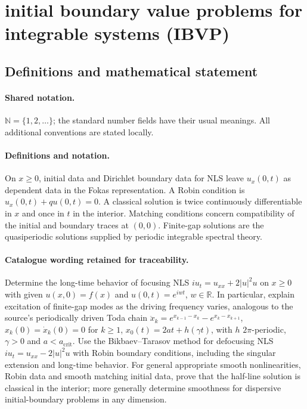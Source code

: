 \documentclass[11pt]{article}
\begin{document}
\section{initial boundary value problems for integrable systems (IBVP)}\label{statement}

\subsection{Definitions and mathematical statement}

\paragraph{Shared notation.}$\mathbb N=\{1,2,\ldots\}$; the standard number fields have their usual meanings. All additional conventions are stated locally.


\paragraph{Definitions and notation.}On $x\ge0$, initial data and Dirichlet boundary data for NLS leave $u_x(0,t)$ as dependent data in the Fokas representation. A Robin condition is $u_x(0,t)+qu(0,t)=0$. A classical solution is twice continuously differentiable in $x$ and once in $t$ in the interior. Matching conditions concern compatibility of the initial and boundary traces at $(0,0)$. Finite-gap solutions are the quasiperiodic solutions supplied by periodic integrable spectral theory.

\paragraph{Catalogue wording retained for traceability.}
Determine the long-time behavior of focusing NLS $iu_t=u_{xx}+2|u|^2u$ on $x\ge0$ with given $u(x,0)=f(x)$ and $u(0,t)=e^{iwt}$, $w\in\mathbb R$. In particular, explain excitation of finite-gap modes as the driving frequency varies, analogous to the source’s periodically driven Toda chain $\ddot x_k=e^{x_{k-1}-x_k}-e^{x_k-x_{k+1}}$, $x_k(0)=\dot x_k(0)=0$ for $k\ge1$, $x_0(t)=2at+h(\gamma t)$, with $h$ $2\pi$-periodic, $\gamma>0$ and $a<a_{\mathrm{crit}}$. Use the Bikbaev--Tarasov method for defocusing NLS $iu_t=u_{xx}-2|u|^2u$ with Robin boundary conditions, including the singular extension and long-time behavior. For general appropriate smooth nonlinearities, Robin data and smooth matching initial data, prove that the half-line solution is classical in the interior; more generally determine smoothness for dispersive initial-boundary problems in any dimension.
\end{document}
